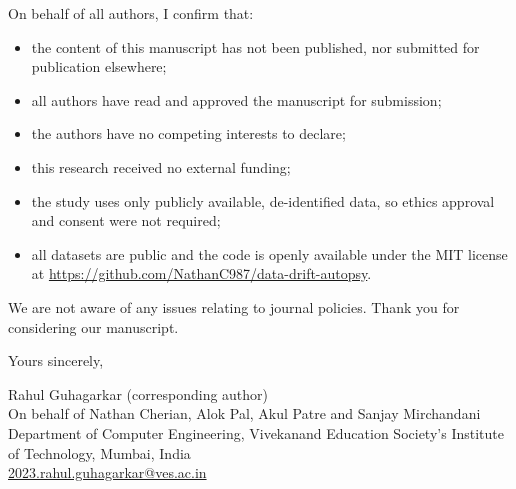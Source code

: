 \documentclass[11pt,a4paper]{article}
\begin{document}
On behalf of all authors, I confirm that:
\begin{itemize}
\item the content of this manuscript has not been published, nor submitted for publication elsewhere;
\item all authors have read and approved the manuscript for submission;
\item the authors have no competing interests to declare;
\item this research received no external funding;
\item the study uses only publicly available, de-identified data, so ethics approval and consent were not required;
\item all datasets are public and the code is openly available under the MIT license at \url{https://github.com/NathanC987/data-drift-autopsy}.
\end{itemize}

We are not aware of any issues relating to journal policies. Thank you for considering our manuscript.

Yours sincerely,

Rahul Guhagarkar (corresponding author)\\
On behalf of Nathan Cherian, Alok Pal, Akul Patre and Sanjay Mirchandani\\
Department of Computer Engineering, Vivekanand Education Society's Institute of Technology, Mumbai, India\\
\url{2023.rahul.guhagarkar@ves.ac.in}
\end{document}

